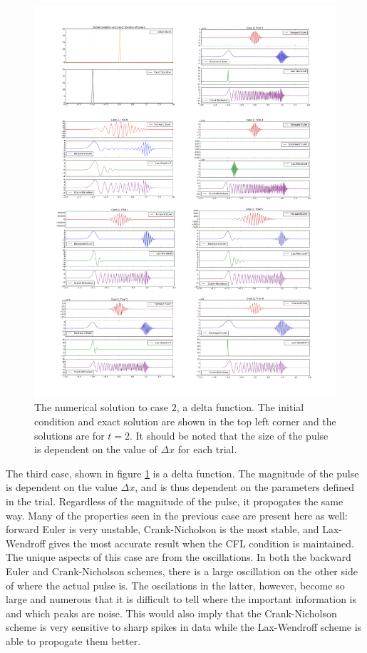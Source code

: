 \documentclass[twocolumn]{article}
\begin{document}
\begin{figure}
  \includegraphics[width=\textwidth]{case2}
  \caption{
    The numerical solution to case $2$, a delta function. The initial
    condition and exact solution are shown in the top left corner and
    the solutions are for $t=2$. It should be noted that the size of
    the pulse is dependent on the value of $\Delta x$ for each trial.
  }
  \label{fig:case2}
\end{figure}

The third case, shown in figure \ref{fig:case2} is a delta
function. The magnitude of the pulse is dependent on the value $\Delta
x$, and is thus dependent on the parameters defined in the
trial. Regardless of the magnitude of the pulse, it propogates the
same way. Many of the properties seen in the previous case are present
here as well: forward Euler is very unstable, Crank-Nicholson is the
most stable, and Lax-Wendroff gives the most accurate result when the
CFL condition is maintained. The unique aspects of this case are from
the oscillations. In both the backward Euler and Crank-Nicholson
schemes, there is a large oscillation on the other side of where the
actual pulse is. The oscilations in the latter, however, become so
large and numerous that it is difficult to tell where the important
information is and which peaks are noise. This would also imply that
the Crank-Nicholson scheme is very sensitive to sharp spikes in data
while the Lax-Wendroff scheme is able to propogate them better.
\end{document}

